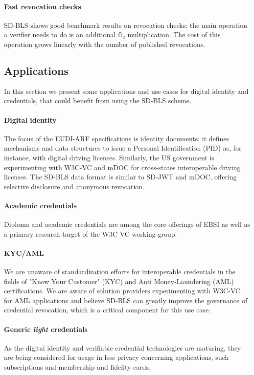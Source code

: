 \paragraph{Fast revocation checks}
SD-BLS shows good benchmark results on revocation checks: the main
operation a verifier needs to do is an additional $\mathbb{G}_2$
multiplication. The cost of this operation grows linearly with the
number of published revocations.

\subsection{Applications}
In this section we present some applications and use cases for digital
identity and credentials, that could benefit from using the SD-BLS
scheme.

\paragraph{Digital identity}
The focus of the EUDI-ARF specifications is identity documents: it
defines mechanisms and data structures to issue a Personal
Identification (PID) as, for instance, with digital driving
licenses. Similarly, the US government is experimenting with W3C-VC
and mDOC for cross-states interoperable driving licenses. The SD-BLS
data format is similar to SD-JWT and mDOC, offering selective
disclosure and anonymous revocation.

\paragraph{Academic credentials}
Diploma and academic credentials are among the core offerings of EBSI
as well as a primary research target of the W3C VC working group.

\paragraph{KYC/AML}
We are unaware of standardization efforts for interoperable
credentials in the fields of "Know Your Customer" (KYC) and Anti
Money-Laundering (AML) certifications. We are aware of solution
providers experimenting with W3C-VC for AML applications and believe
SD-BLS can greatly improve the governance of credential revocation,
which is a critical component for this use case.

\paragraph{Generic \textit{light} credentials}
As the digital identity and verifiable credential technologies are
maturing, they are being considered for usage in less privacy
concerning applications, such subscriptions and membership and
fidelity cards.

